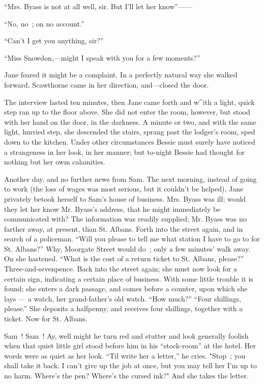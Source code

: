 ``Mrs. Byass is not at all well, sir. But I'll let her know''------

``No, no~; on no account.''

``Can't I get you anything, sir?''

{} ``Miss Snowdon,---might I speak with you for a few moments?''

Jane feared it might be a complaint. In a perfectly natural way she
walked forward. Scawthorne came in her direction, and---closed the door.

The interview lasted ten minutes, then Jane came forth and w\^{}ith a
light, quick step ran up to the floor above. She did not enter the room,
however, but stood with her hand on the door, in the darkness. A minute
or two, and with the same light, hurried step, she descended the stairs,
sprang past the lodger's room, sped down to the kitchen. Under other
circumstances Bessie must surely have noticed a strangeness in her look,
in her manner; but to-night Bessie had thought for nothing but her owm
calamities.

Another day, and no further news from Sam. The next morning, instead of
going to work (the loss of wages was most serious, but it couldn't be
helped), Jane privately betook herself to Sam's house of business. Mrs.
Byass was ill; would they let her know Mr. Byass's address, that he
might immediately be communicated with? The information was {} readily
supplied; Mr. Byass was no farther away, at present, tlian St. Albans.
Forth into the street again, and in search of a policeman. ``Will you
please to tell me what station I have to go to for St. Albans?'' Why,
Moorgate Street would do~; only a few minutes' walk away. On she
hastened. ``What is the cost of a return ticket to St. Albans, please?''
Three-and-sevenpence. Back into the street again; she must now look for
a certain sign, indicating a certain place of business. With some little
trouble it is found; she enters a dark passage, and comes before a
counter, upon which she lays --- a watch, her grand-father's old watch.
``How much?'' ``Four shillings, please.'' She deposits a halfpenny, and
receives four shillings, together with a ticket. Now for St. Albans.

Sam~! Sam~! Ay, well might he turn red and stutter and look generally
foolish when that quiet little girl stood before him in his
``stock-room'' at the hotel. Her words were as quiet as her look. ``Til
write her a letter,'' he cries. "Stop~; you shall take it back. I can't
give up the job at once, but you may tell her I'm up to no harm. Where's
the pen? {} Where's the cursed ink?" And she takes the letter.

